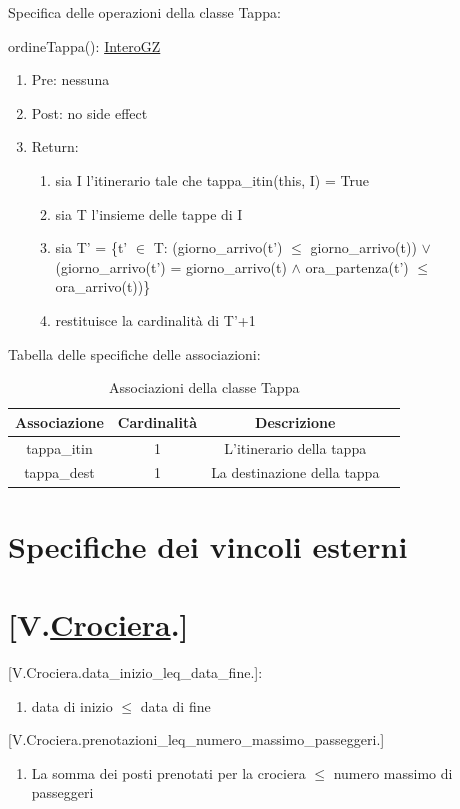 \documentclass{article}
\begin{document}
Specifica delle operazioni della classe Tappa:

ordineTappa(): \hyperref[sec:InteroGZ]{InteroGZ}
\begin{enumerate}
    \item Pre: nessuna
    \item Post: no side effect
    \item Return:
    \begin{enumerate}
        \item sia I l'itinerario tale che tappa\_itin(this, I) = True
        \item sia T l'insieme delle tappe di I
        \item sia T' = \{t' $\in$ T: (giorno\_arrivo(t') $\leq$ giorno\_arrivo(t)) \newline $\lor$ (giorno\_arrivo(t') = giorno\_arrivo(t) $\land$ ora\_partenza(t') $\leq$ ora\_arrivo(t))\}
        \item restituisce la cardinalità di T'+1
    \end{enumerate}
\end{enumerate}


Tabella delle specifiche delle associazioni:
\begin{table}[h!]
    \centering
    \begin{tabular}{|c|c|c|c|}
        \hline
        Associazione & Cardinalità & Descrizione \\
        \hline
        tappa\_itin & 1 & L'itinerario della tappa \\
        tappa\_dest & 1 & La destinazione della tappa \\
        \hline
    \end{tabular}
    \caption{Associazioni della classe Tappa}
\end{table}

\newpage
\section{Specifiche dei vincoli esterni}

\section*{[V.\hyperref[sec:Crociera]{Crociera}.]}
    [V.Crociera.data\_inizio\_leq\_data\_fine.]:
    \begin{enumerate}
        \item data di inizio $\leq$ data di fine
    \end{enumerate}
    [V.Crociera.prenotazioni\_leq\_numero\_massimo\_passeggeri.]
    \begin{enumerate}
        \item La somma dei posti prenotati per la crociera $\leq$ numero massimo di passeggeri
    \end{enumerate}
\end{document}
